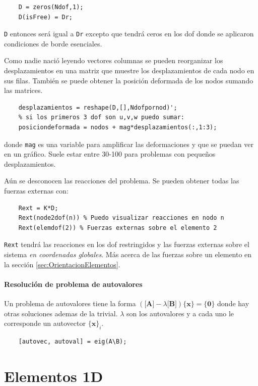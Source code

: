 \documentclass[11pt, a4paper,titlepage]{article}
\newcommand{\Mme}[1]{\boldsymbol{[}\mathbf{#1} \boldsymbol{]}}
\newcommand{\Cme}[1]{\boldsymbol{\{ }\mathbf{#1} \boldsymbol{\}} }
\begin{document}
\begin{verbatim}
    D = zeros(Ndof,1);
    D(isFree) = Dr;
\end{verbatim}
\texttt{D} entonces será igual a \texttt{Dr} excepto que tendrá ceros en los dof donde se aplicaron condiciones de borde esenciales.

Como nadie nació leyendo vectores columnas se pueden reorganizar los desplazamientos en una matriz que muestre los desplazamientos de cada nodo en sus filas. También se puede obtener la posición deformada de los nodos sumando las matrices.
\begin{verbatim}
    desplazamientos = reshape(D,[],Ndofpornod)';
    % si los primeros 3 dof son u,v,w puedo sumar:
    posiciondeformada = nodos + mag*desplazamientos(:,1:3); 
\end{verbatim}
 donde \texttt{mag} es una variable para amplificar las deformaciones y que se puedan ver en un gráfico. Suele estar entre 30-100 para problemas con pequeños desplazamientos.

Aún se desconocen las reacciones del problema. Se pueden obtener todas las fuerzas externas con:
\begin{verbatim}
    Rext = K*D;
    Rext(node2dof(n)) % Puedo visualizar reacciones en nodo n
    Rext(elemdof(2)) % Fuerzas externas sobre el elemento 2
\end{verbatim}
\texttt{Rext} tendrá las reacciones en los dof restringidos y las fuerzas externas sobre el sistema \textit{en coordenadas globales}. Más acerca de las fuerzas sobre un elemento en la sección \ref{sec:OrientacionElementos}.

\subsection*{Resolución de problema de autovalores}
Un problema de autovalores tiene la forma $\left(\Mme{A} - \lambda \Mme{B} \right) \Cme{x} = \Cme{0}$ donde hay otras soluciones ademas de la trivial. $\lambda$ son los autovalores y a cada uno le corresponde un autovector $\Cme{x}_i$.

\begin{verbatim}
	[autovec, autoval] = eig(A\B);
\end{verbatim}
\part{Elementos 1D}
\end{document}
